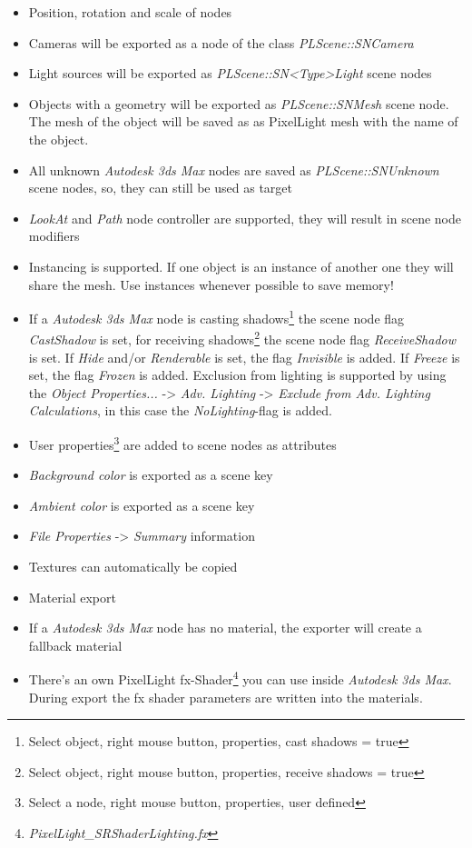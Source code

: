 \begin{itemize}
\item{Position, rotation and scale of nodes}
\item{Cameras will be exported as a node of the class \emph{PLScene::SNCamera}}
\item{Light sources will be exported as \emph{PLScene::SN<Type>Light} scene nodes}
\item{Objects with a geometry will be exported as \emph{PLScene::SNMesh} scene node. The mesh of the object will be saved as as PixelLight mesh with the name of the object.}
\item{All unknown \emph{Autodesk 3ds Max} nodes are saved as \emph{PLScene::SNUnknown} scene nodes, so, they can still be used as target}
\item{\emph{LookAt} and \emph{Path} node controller are supported, they will result in scene node modifiers}
\item{Instancing is supported. If one object is an instance of another one they will share the mesh. Use instances whenever possible to save memory!}
\item{If a \emph{Autodesk 3ds Max} node is casting shadows\footnote{Select object, right mouse button, properties, cast shadows = true} the scene node flag \emph{CastShadow} is set, for receiving shadows\footnote{Select object, right mouse button, properties, receive shadows = true} the scene node flag \emph{ReceiveShadow} is set. If \emph{Hide} and/or \emph{Renderable} is set, the flag \emph{Invisible} is added. If \emph{Freeze} is set, the flag \emph{Frozen} is added. Exclusion from lighting is supported by using the \emph{Object Properties...} -> \emph{Adv. Lighting} -> \emph{Exclude from Adv. Lighting Calculations}, in this case the \emph{NoLighting}-flag is added.}
\item{User properties\footnote{Select a node, right mouse button, properties, user defined} are added to scene nodes as attributes}
\item{\emph{Background color} is exported as a scene key}
\item{\emph{Ambient color} is exported as a scene key}
\item{\emph{File Properties} -> \emph{Summary} information}
\item{Textures can automatically be copied}
\item{Material export}
\item{If a \emph{Autodesk 3ds Max} node has no material, the exporter will create a fallback material}
\item{There's an own PixelLight fx-Shader\footnote{\emph{PixelLight\_SRShaderLighting.fx}} you can use inside \emph{Autodesk 3ds Max}. During export the fx shader parameters are written into the materials.}

\end{itemize}

